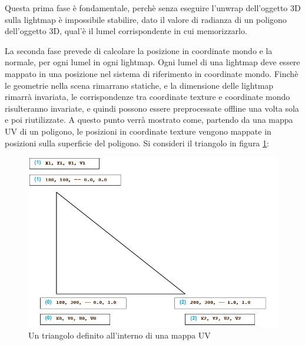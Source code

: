 Questa prima fase è fondamentale, perchè senza eseguire l’unwrap dell’oggetto 3D sulla lightmap è impossibile stabilire, dato il valore di radianza di un poligono dell’oggetto 3D, qual’è il lumel corrispondente in cui memorizzarlo.

La seconda fase prevede di calcolare la posizione in coordinate mondo e la normale, per ogni lumel in ogni lightmap.
Ogni lumel di una lightmap deve essere mappato in una posizione nel sistema di riferimento in coordinate mondo. Finchè le geometrie nella scena rimarrano statiche, e la dimensione delle lightmap rimarrà invariata, le corrispondenze tra coordinate texture e coordinate mondo risulteranno invariate, e quindi possono essere preprocessate offline una volta sola e poi riutilizzate.
A questo punto verrà mostrato come, partendo da una mappa UV di un poligono, le posizioni in coordinate texture vengono mappate in posizioni sulla superficie del poligono.
Si consideri il triangolo in figura \ref{fig:stato_arte_ligh_triangle1}: 
\\
\begin{figure}[htb]
 \centering
 \includegraphics[width=1\linewidth]{images/chapter_stato_arte/stato_arte_ligh_triangle1.png}\hfill
 \caption[Triangolo di esempio per mapping UV]{Un triangolo definito all'interno di una mappa UV}
 \label{fig:stato_arte_ligh_triangle1}
\end{figure}

